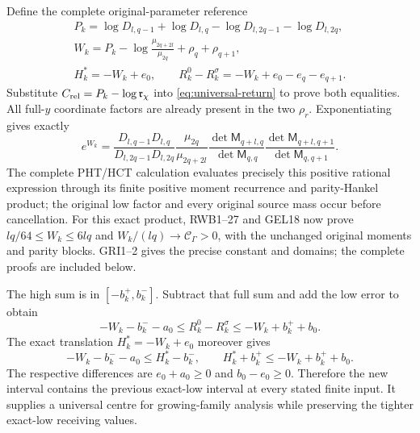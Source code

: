 \documentclass[11pt,a4paper]{article}
\begin{document}
Define the complete original-parameter reference
\begin{equation}
\begin{gathered}
 P_k=\log D_{l,q-1}+\log D_{l,q}
                         -\log D_{l,2q-1}-\log D_{l,2q},\\
 W_k=P_k-\log\frac{\mu_{2q+2l}}{\mu_{2q}}+\rho_q+\rho_{q+1},\\
 H_k^*=-W_k+e_0,\qquad
 R_k^0-R_k^\sigma=-W_k+e_0-e_q-e_{q+1}.
\end{gathered}\label{eq:universal-entire-centre}
\end{equation}
Substitute $C_{\rm rel}=P_k-\log\mathfrak r_\chi$
into \eqref{eq:universal-return} to prove both equalities.
All full-$y$ coordinate factors are already present in the
two $\rho_r$. Exponentiating gives exactly
\begin{equation}
 e^{W_k}=\frac{D_{l,q-1}D_{l,q}}{D_{l,2q-1}D_{l,2q}}
 \frac{\mu_{2q}}{\mu_{2q+2l}}
 \frac{\det\mathsf M_{q+l,q}}{\det\mathsf M_{q,q}}
 \frac{\det\mathsf M_{q+l,q+1}}{\det\mathsf M_{q,q+1}}.
 \label{eq:positive-entire-centre}
\end{equation}
The complete PHT/HCT calculation evaluates precisely this
positive rational expression through its finite positive moment
recurrence and parity-Hankel product; the original low factor
and every original source mass occur before cancellation.
For this exact product, RWB1--27 and GEL18 now prove
$lq/64\leq W_k\leq6lq$ and
$W_k/(lq)\to\mathcal C_\Gamma>0$, with the unchanged
original moments and parity blocks. GRI1--2 gives the precise
constant and domains; the complete proofs are included below.

The high sum is in $[-b_k^+,b_k^-]$. Subtract that full
sum and add the low error to obtain
\begin{equation}
 -W_k-b_k^--a_0\leq R_k^0-R_k^\sigma
                         \leq-W_k+b_k^++b_0.
 \label{eq:universal-fourth-interval}
\end{equation}
The exact translation $H_k^*=-W_k+e_0$ moreover gives
\begin{equation}
 -W_k-b_k^--a_0\leq H_k^*-b_k^-,\qquad
 H_k^*+b_k^+\leq-W_k+b_k^++b_0.
 \label{eq:universal-interval-containment}
\end{equation}
The respective differences are $e_0+a_0\geq0$ and
$b_0-e_0\geq0$. Therefore the new interval contains
the previous exact-low interval at every stated finite input.
It supplies a universal centre for growing-family analysis
while preserving the tighter exact-low receiving values.
\end{document}
